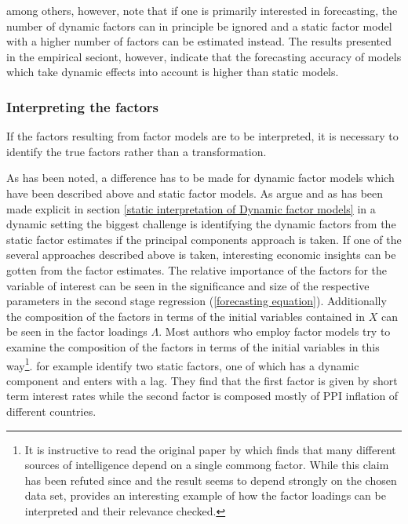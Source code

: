 \documentclass[12pt]{article}
\begin{document}
\citet{breitung2011testing} among others, however, note that if one is primarily interested in forecasting, the number of dynamic factors can in principle be ignored and a static factor model with a higher number of factors can be estimated instead. The results presented in the empirical seciont, however, indicate that the forecasting accuracy of models which take dynamic effects into account is higher than static models.

\subsubsection{Interpreting the factors}
If the factors resulting from factor models are to be interpreted, it is necessary to identify the true factors rather than a transformation. 

As has been noted, a difference has to be made for dynamic factor models which have been described above and static factor models. As \citet{breitung2004identification} argue and as has been made explicit in section \ref{static interpretation of Dynamic factor models} in a dynamic setting the biggest challenge is identifying the dynamic factors from the static factor estimates if the principal components approach is taken. If one of the several approaches described above is taken, interesting economic insights can be gotten from the factor estimates. The relative importance of the factors for the variable of interest can be seen in the significance and size of the respective parameters in the second stage regression (\ref{forecasting equation}). Additionally the composition of the factors in terms of the initial variables contained in $X$ can be seen in the factor loadings $\Lambda$. Most authors who employ factor models try to examine the composition of the factors in terms of the initial variables in this way\footnote{It is instructive to read the original paper by \citet{spearman1904general} which finds that many different sources of intelligence depend on a single commong factor. While this claim has been refuted since and the result seems to depend strongly on the chosen data set, \citet{spearman1904general} provides an interesting example of how the factor loadings can be interpreted and their relevance checked.}. \citet{breitung2004identification} for example identify two static factors, one of which has a dynamic component and enters with a lag. They find that the first factor is given by short term interest rates while the second factor is composed mostly of PPI inflation of different countries.
\end{document}
